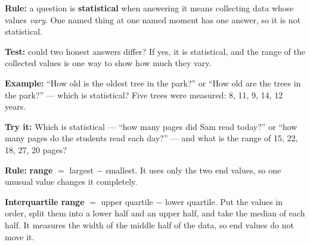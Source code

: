 \documentclass[12pt]{article}
\begin{document}


\begin{formulabox}
\textbf{Rule:} a question is \textbf{statistical} when answering it means
collecting data whose values \emph{vary}. One named thing at one named moment
has one answer, so it is not statistical.\par
\textbf{Test:} could two honest answers differ? If yes, it is statistical, and
the range of the collected values is one way to show how much they vary.
\end{formulabox}

\begin{examplebox}
\textbf{Example:} \quad ``How old is the oldest tree in the park?'' or ``How old
are the trees in the park?'' --- which is statistical? Five trees were measured:
8, 11, 9, 14, 12 years.
\end{examplebox}

\begin{tryitbox}
\textbf{Try it:} \quad Which is statistical --- ``how many pages did Sam read
today?'' or ``how many pages do the students read each day?'' --- and what is
the range of 15, 22, 18, 27, 20 pages?\\[2pt]
\end{tryitbox}


\begin{formulabox}
\textbf{Rule:} \textbf{range} $=$ largest $-$ smallest. It uses only the two end
values, so one unusual value changes it completely.\par
\textbf{Interquartile range} $=$ upper quartile $-$ lower quartile. Put the
values in order, split them into a lower half and an upper half, and take the
median of each half. It measures the width of the middle half of the data, so
end values do not move it.
\end{formulabox}
\end{document}
